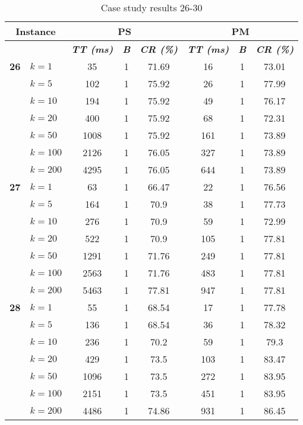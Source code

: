     \begin{table}[htbp]
    \caption{Case study results 26-30}
    \centering
    \begin{tabular}{|l|l|c|c|c|c|c|c|}
    \hline
    \multicolumn{ 2}{|c|}{\textbf{Instance}} & \multicolumn{ 3}{c|}{\textbf{PS}} & \multicolumn{ 3}{c|}{\textbf{PM}} \\ \hline
    \multicolumn{ 2}{|l|}{} & \textbf{\textit{TT (ms)}} & \textbf{\textit{B}} & \textbf{\textit{CR (\%)}} & \textbf{\textit{TT (ms)}} & \textbf{\textit{B}} & \textbf{\textit{CR (\%)}} \\ \hline
    \multicolumn{1}{|r|}{\textbf{26}} & $k=1$ & 35 & 1 & 71.69 & 16 & 1 & 73.01 \\ 
     & $k=5$ & 102 & 1 & 75.92 & 26 & 1 & 77.99 \\ 
     & $k=10$ & 194 & 1 & 75.92 & 49 & 1 & 76.17 \\ 
     & $k=20$ & 400 & 1 & 75.92 & 68 & 1 & 72.31 \\ 
     & $k=50$ & 1008 & 1 & 75.92 & 161 & 1 & 73.89 \\ 
     & $k=100$ & 2126 & 1 & 76.05 & 327 & 1 & 73.89 \\ 
     & $k=200$ & 4295 & 1 & 76.05 & 644 & 1 & 73.89 \\ \hline
    \multicolumn{1}{|r|}{\textbf{27}} & $k=1$ & 63 & 1 & 66.47 & 22 & 1 & 76.56 \\ 
     & $k=5$ & 164 & 1 & 70.9 & 38 & 1 & 77.73 \\ 
     & $k=10$ & 276 & 1 & 70.9 & 59 & 1 & 72.99 \\ 
     & $k=20$ & 522 & 1 & 70.9 & 105 & 1 & 77.81 \\ 
     & $k=50$ & 1291 & 1 & 71.76 & 249 & 1 & 77.81 \\ 
     & $k=100$ & 2563 & 1 & 71.76 & 483 & 1 & 77.81 \\ 
     & $k=200$ & 5463 & 1 & 77.81 & 947 & 1 & 77.81 \\ \hline
    \multicolumn{1}{|r|}{\textbf{28}} & $k=1$ & 55 & 1 & 68.54 & 17 & 1 & 77.78 \\ 
     & $k=5$ & 136 & 1 & 68.54 & 36 & 1 & 78.32 \\ 
     & $k=10$ & 236 & 1 & 70.2 & 59 & 1 & 79.3 \\ 
     & $k=20$ & 429 & 1 & 73.5 & 103 & 1 & 83.47 \\ 
     & $k=50$ & 1096 & 1 & 73.5 & 272 & 1 & 83.95 \\ 
     & $k=100$ & 2151 & 1 & 73.5 & 451 & 1 & 83.95 \\ 
     & $k=200$ & 4486 & 1 & 74.86 & 931 & 1 & 86.45 \\ \hline

\end{tabular}
\end{table}
